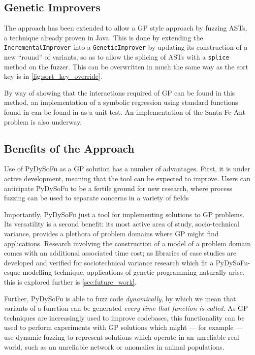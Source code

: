 \documentclass[draft,12pt]{llncs}   %
\begin{document}
\subsection{Genetic Improvers}

The approach has been extended to allow a GP style approach by fuzzing ASTs, a
technique already proven in Java\cite{castle2012evolving,cody2015locogp}. This
is done by extending the \texttt{IncrementalImprover} into a
\texttt{GeneticImprover} by updating its construction of a new ``round'' of
variants, so as to allow the splicing of ASTs with a \texttt{splice} method on
the fuzzer. This
can be overwritten in much the same way as the sort key is in
\cref{fig:sort_key_override}.

By way of showing that the interactions required of GP can be found in this
method, an implementation of a symbolic regression using standard functions
found in \cite{koza1994genetic} can be found in
\cite{pydysofu} as a unit test. An implementation of the Santa Fe Ant problem is
also underway.

\subsection{Benefits of the Approach}
Use of PyDySoFu as a GP solution has a number of advantages. First, it is under
active development, meaning that the tool can be expected to improve. Users can
anticipate PyDySoFu to be a fertile ground for new research, where process
fuzzing can be used to separate concerns in a variety of fields\par

Importantly, PyDySoFu just a tool for implementing solutions to GP problems. Its
versatility is a second benefit: its most active area of study, socio-technical
variance, provides a plethora of problem domains where GP might find
applications. Research involving the construction of a model of a problem domain
comes with an additional associated time cost; as libraries of case studies are
developed and verified for sociotechnical variance research which fit a
PyDySoFu-esque modelling technique, applications of genetic programming
naturally arise. this is explored further is \cref{sec:future_work}.\par

Further, PyDySoFu is able to fuzz code \emph{dynamically}, by which we mean that variants
of a function can be generated \emph{every time that function is called}. As GP
techniques are increasingly used to improve codebases, this functionality can be
used to perform experiments with GP solutions which might --- for example ---
use dynamic fuzzing to represent solutions which operate in an unreliable real
world, such as an unreliable network or anomalies in animal populations.\par
\end{document}
